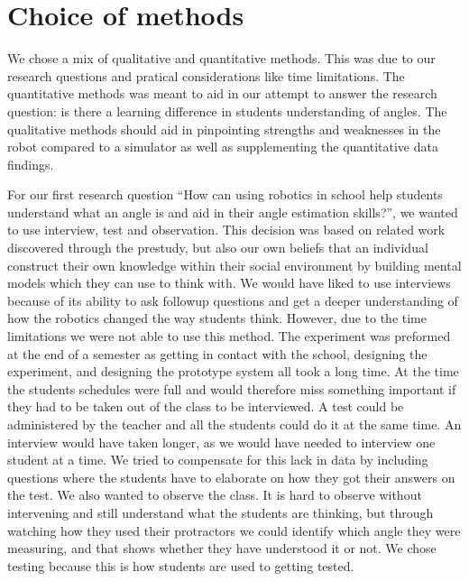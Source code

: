\section{Choice of methods}
We chose a mix of qualitative and quantitative methods. This was due to our research questions and pratical considerations like time limitations. 
The quantitative methods was meant to aid in our attempt to answer the research question: is there a learning difference in students understanding of angles. The qualitative methods should aid in pinpointing strengths and weaknesses in the robot compared to a simulator as well as supplementing the quantitative data findings. 

\bigskip\noindent
For our first research question ``How can using robotics in school help students understand what an angle is and aid in their angle estimation skills?'', we wanted to use interview, test and observation. This decision was based on related work discovered through the prestudy, but also our own beliefs that an individual construct their own knowledge within their social environment by building mental models which they can use to think with. We would have liked to use interviews because of its ability to ask followup questions and get a deeper understanding of how the robotics changed the way students think. 
However, due to the time limitations we were not able to use this method. 
The experiment was preformed at the end of a semester as getting in contact with the school, designing the experiment, and designing the prototype system all took a long time.
At the time the students schedules were full and would therefore miss something important if they had to be taken out of the class to be interviewed. A test could be administered by the teacher and all the students could do it at the same time. An interview would have taken longer, as we would have needed to interview one student at a time. We tried to compensate for this lack in data by including questions where the students have to elaborate on how they got their answers on the test. We also wanted to observe the class. It is hard to observe without intervening and still understand what the students are thinking, but through watching how they used their protractors we could identify which angle they were measuring, and that shows whether they have understood it or not. We chose testing because this is how students are used to getting tested.

